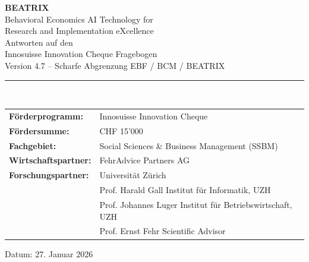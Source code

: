 \documentclass[11pt,a4paper]{article}
\begin{document}

\begin{titlepage}
\centering
\vspace*{2cm}

{\Huge\bfseries\color{fehrblue} BEATRIX}\\[0.5cm]
{\Large Behavioral Economics AI Technology for\\Research and Implementation eXcellence}\\[2cm]

{\LARGE Antworten auf den\\Innosuisse Innovation Cheque Fragebogen}\\[1cm]

{\large Version 4.7 -- Scharfe Abgrenzung EBF / BCM / BEATRIX}\\[2cm]

\rule{0.8\textwidth}{0.5pt}\\[1.5cm]

\begin{tabular}{ll}
\textbf{Förderprogramm:} & Innosuisse Innovation Cheque \\[0.3cm]
\textbf{Fördersumme:} & CHF 15'000 \\[0.3cm]
\textbf{Fachgebiet:} & Social Sciences \& Business Management (SSBM) \\[0.3cm]
\textbf{Wirtschaftspartner:} & FehrAdvice Partners AG \\[0.3cm]
\textbf{Forschungspartner:} & Universität Zürich \\[0.3cm]
& Prof. Harald Gall \quad Institut für Informatik, UZH \\
& Prof. Johannes Luger \quad Institut für Betriebswirtschaft, UZH \\
& Prof. Ernst Fehr \quad Scientific Advisor \\
\end{tabular}

\vfill


\vfill

{\large Datum: 27. Januar 2026}

\end{titlepage}
\end{document}
